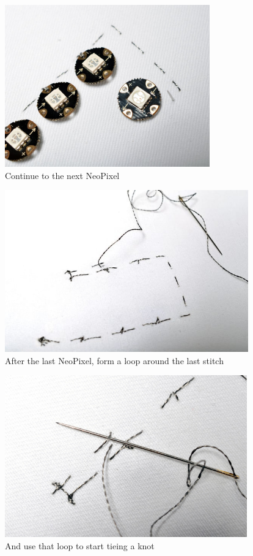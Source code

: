 \documentclass[letterpaper,twoside,12pt]{article}
\begin{document}
\begin{figure}[hbpt]\begin{centering}%
\includegraphics[height=2.75in]{flora_DSC_0116.jpg}
\caption{Continue to the next NeoPixel}
\label{fig:flora_DSC_0116}
\end{centering}\end{figure}
\begin{figure}[hbpt]\begin{centering}%
\includegraphics[height=2.75in]{flora_DSC_0118.jpg}
\caption{After the last NeoPixel, form a loop around the last stitch}
\label{fig:flora_DSC_0118}
\end{centering}\end{figure}
\begin{figure}[hbpt]\begin{centering}%
\includegraphics[height=2.75in]{flora_DSC_0119.jpg} 
\caption{And use that loop to start tieing a knot}
\label{fig:flora_DSC_0119}
\end{centering}\end{figure}
\end{document}
